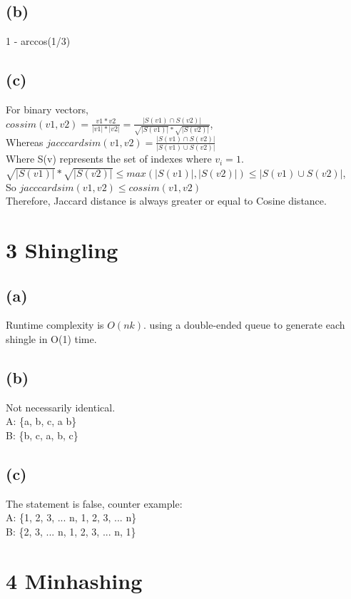 \documentclass{article}
\begin{document}
\subsection{(b)}
1 - arccos(1/3)


\subsection{(c)}
For binary vectors, \\
$cossim(v1,v2) = \frac{v1*v2}{|v1|*|v2|} =   \frac{|S(v1) \cap S(v2)|}{\sqrt{|S(v1)|}*\sqrt{|S(v2)|}}$,\\
Whereas $jacccardsim(v1,v2) = \frac{|S(v1) \cap S(v2)|}{|S(v1) \cup S(v2)|}$ \\
Where S(v) represents the set of indexes where $v_i = 1$. \\
$\sqrt{|S(v1)|}*\sqrt{|S(v2)|} \le max(|S(v1)|, |S(v2)|) \le |S(v1) \cup S(v2)|$,\\
So $jacccardsim(v1,v2) \le cossim(v1,v2)$ \\
Therefore, Jaccard distance is always greater or equal to Cosine distance.
 
\section{3 Shingling}
\subsection{(a)}
Runtime complexity is $O(nk)$. using a double-ended queue to generate each shingle in O(1) time.

\subsection{(b)}
Not necessarily identical. \\
A: \{a, b, c, a b\} \\
B: \{b, c, a, b, c\} 

\subsection{(c)}
The statement is false, counter example: \\
A: \{1, 2, 3, ... n, 1, 2, 3, ... n\} \\
B: \{2, 3, ... n, 1, 2, 3, ... n, 1\}
 
\section{4 Minhashing}
\end{document}
